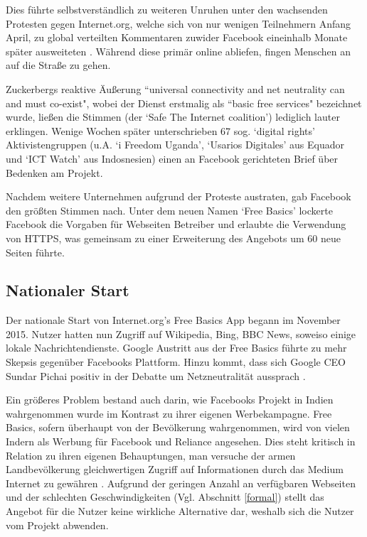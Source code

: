 \documentclass{article}
\begin{document}
\medskip

Dies führte selbstverständlich zu weiteren Unruhen unter den wachsenden Protesten gegen Internet.org, welche sich von nur wenigen Teilnehmern Anfang April, zu global verteilten Kommentaren zuwider Facebook eineinhalb Monate später ausweiteten \autocite{BBC3}.
Während diese primär online abliefen, fingen Menschen an auf die Straße zu gehen.

\medskip

Zuckerbergs reaktive Äußerung ``universal connectivity and net neutrality can and must co-exist", wobei der Dienst erstmalig als ``basic free services" bezeichnet wurde, ließen die Stimmen (der `Safe The Internet coalition') lediglich lauter erklingen.
Wenige Wochen später unterschrieben 67 sog. `digital rights' Aktivistengruppen (u.A. `i Freedom Uganda', `Usarios Digitales' aus Equador und `ICT Watch' aus Indosnesien) einen an Facebook gerichteten Brief über Bedenken am Projekt.

\medskip

Nachdem weitere Unternehmen aufgrund der Proteste austraten, gab Facebook den größten Stimmen nach. Unter dem neuen Namen `Free Basics' lockerte Facebook die Vorgaben für Webseiten Betreiber und erlaubte die Verwendung von HTTPS, was gemeinsam zu einer Erweiterung des Angebots um 60 neue Seiten führte.

\subsection{Nationaler Start} \label{national}

Der nationale Start von Internet.org's Free Basics App begann im November 2015. Nutzer hatten nun Zugriff auf Wikipedia, Bing, BBC News, soweiso einige lokale Nachrichtendienste.
Google Austritt aus der Free Basics führte zu mehr Skepsis gegenüber Facebooks Plattform.
Hinzu kommt, dass sich Google CEO Sundar Pichai positiv in der Debatte um Netzneutralität aussprach \parencite{easeOfBusiness}.

Ein größeres Problem bestand auch darin, wie Facebooks Projekt in Indien wahrgenommen wurde im Kontrast zu ihrer eigenen Werbekampagne.
Free Basics, sofern überhaupt von der Bevölkerung wahrgenommen, wird von vielen Indern als Werbung für Facebook und Reliance angesehen.
Dies steht kritisch in Relation zu ihren eigenen Behauptungen, man versuche der armen Landbevölkerung gleichwertigen Zugriff auf Informationen durch das Medium Internet zu gewähren \parencite[4]{everydayLife}.
Aufgrund der geringen Anzahl an verfügbaren Webseiten und der schlechten Geschwindigkeiten (Vgl. Abschnitt \ref{formal}) stellt das Angebot für die Nutzer keine wirkliche Alternative dar, weshalb sich die Nutzer vom Projekt abwenden\autocite{nyt1}.
	
\end{document}
